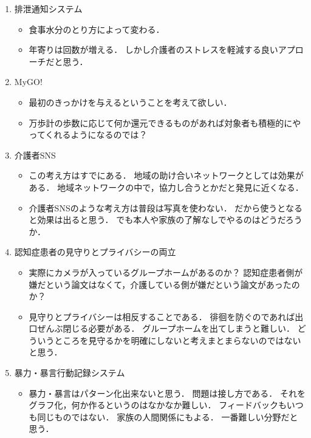 \documentclass[../report]{subfiles}
\begin{document}
\begin{enumerate}
    \item[] 排泄通知システム
\begin{itemize}
    \item 食事水分のとり方によって変わる．
    \item 年寄りは回数が増える．
しかし介護者のストレスを軽減する良いアプローチだと思う．
\end{itemize}

    \item[] MyGO!
\begin{itemize}
    \item 最初のきっかけを与えるということを考えて欲しい．
    \item 万歩計の歩数に応じて何か還元できるものがあれば対象者も積極的にやってくれるようになるのでは？
\end{itemize}

    \item[] 介護者SNS
\begin{itemize}
    \item この考え方はすでにある．
地域の助け合いネットワークとしては効果がある．
地域ネットワークの中で，協力し合うとかだと発見に近くなる．
    \item 介護者SNSのような考え方は普段は写真を使わない．
だから使うとなると効果は出ると思う．
でも本人や家族の了解なしでやるのはどうだろうか．
\end{itemize}

    \item[] 認知症患者の見守りとプライバシーの両立
\begin{itemize}
    \item 実際にカメラが入っているグループホームがあるのか？
認知症患者側が嫌だという論文はなくて，介護している側が嫌だという論文があったのか？
    \item 見守りとプライバシーは相反することである．
徘徊を防ぐのであれば出口ぜんぶ閉じる必要がある．
グループホームを出てしまうと難しい．
どういうところを見守るかを明確にしないと考えまとまらないのではないと思う．
\end{itemize}

    \item[] 暴力・暴言行動記録システム
\begin{itemize}
    \item 暴力・暴言はパターン化出来ないと思う．
問題は接し方である．
それをグラフ化，何か作るというのはなかなか難しい．
フィードバックもいつも同じものではない．
家族の人間関係にもよる．
一番難しい分野だと思う．
\end{itemize}
\end{enumerate}
\end{document}
